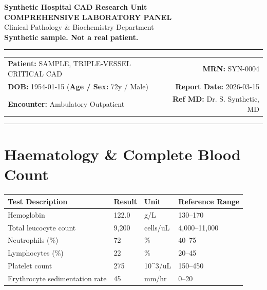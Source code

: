 \documentclass[10pt,a4paper]{article}
\begin{document}
\begin{center}
  {\Large \textbf{Synthetic Hospital CAD Research Unit}}\\
  \vspace{2pt}
  {\normalsize \textbf{COMPREHENSIVE LABORATORY PANEL}}\\
  \vspace{1pt}
  {\footnotesize \textcolor{subtext}{Clinical Pathology \& Biochemistry Department}}\\
  \vspace{4pt}
  {\small \textbf{\textcolor{red!75!black}{Synthetic sample. Not a real patient.}}}\\
  \vspace{3pt}
  \textcolor{linecolor}{\rule{\textwidth}{0.8pt}}
\end{center}

\vspace{2pt}

\noindent
\begin{tabular*}{\textwidth}{@{} l @{\extracolsep{\fill}} r @{}}
  \textbf{Patient:} SAMPLE, TRIPLE-VESSEL CRITICAL CAD & \textbf{MRN:} SYN-0004 \\
  \textbf{DOB:} 1954-01-15 \quad (\textbf{Age / Sex:} 72y / Male) & \textbf{Report Date:} 2026-03-15 \\
  \textbf{Encounter:} Ambulatory Outpatient & \textbf{Ref MD:} Dr. S. Synthetic, MD \\
\end{tabular*}

\vspace{2pt}
\noindent\textcolor{linecolor}{\rule{\textwidth}{0.4pt}}
\vspace{6pt}


\section*{Haematology \& Complete Blood Count}

\begin{tabular}{@{} p{6.4cm} p{2.5cm} p{2.5cm} p{3.1cm} @{}}
  \toprule
  \textbf{Test Description} & \textbf{Result} & \textbf{Unit} & \textbf{Reference Range} \\
  \midrule
  Hemoglobin & 122.0 & g/L & 130--170 \\
  Total leucocyte count & 9,200 & cells/uL & 4,000--11,000 \\
  Neutrophils (\%) & 72 & \% & 40--75 \\
  Lymphocytes (\%) & 22 & \% & 20--45 \\
  Platelet count & 275 & 10\textasciicircum 3/uL & 150--450 \\
  Erythrocyte sedimentation rate & 45 & mm/hr & 0--20 \\
  \bottomrule
\end{tabular}
\end{document}
